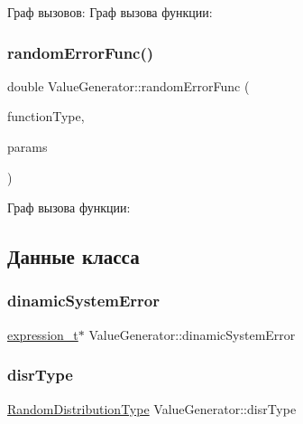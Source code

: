 Граф вызовов\+:
Граф вызова функции\+:
\mbox{\label{class_value_generator_a87e54f9bff53072f70c89cc1490dbd4e}} 
\subsubsection{\texorpdfstring{random\+Error\+Func()}{randomErrorFunc()}}
{\footnotesize\ttfamily double Value\+Generator\+::random\+Error\+Func (\begin{DoxyParamCaption}\item[{\hyperlink{_random_types_8h_ad7b55c73a22b009b1551ea87b0955a60}{Random\+Distribution\+Type}}]{function\+Type,  }\item[{Q\+Vector$<$ double $>$}]{params }\end{DoxyParamCaption})}

Граф вызова функции\+:


\subsection{Данные класса}
\mbox{\label{class_value_generator_ac6113fdaf5766febc4900b2043c07f95}} 
\subsubsection{\texorpdfstring{dinamic\+System\+Error}{dinamicSystemError}}
{\footnotesize\ttfamily \hyperlink{reggenerator_8h_af27600befe001c40c3fe341f6fafc956}{expression\+\_\+t}$\ast$ Value\+Generator\+::dinamic\+System\+Error}

\mbox{\label{class_value_generator_a876b8fbdbf50aa645995ffb9b8305696}} 
\subsubsection{\texorpdfstring{disr\+Type}{disrType}}
{\footnotesize\ttfamily \hyperlink{_random_types_8h_ad7b55c73a22b009b1551ea87b0955a60}{Random\+Distribution\+Type} Value\+Generator\+::disr\+Type}

